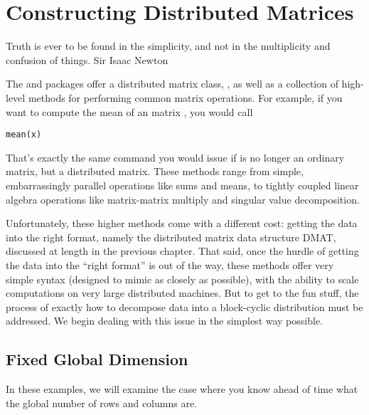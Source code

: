 
\chapter{Constructing Distributed Matrices}
\label{chap:makedmat}

\inspire%
{Truth is ever to be found in the simplicity, and not in the multiplicity and confusion of things. 
}%
{Sir Isaac Newton}
\vspace{0.5cm}


The  and  packages offer a distributed matrix class,
,
as well as a collection of high-level methods for performing common matrix 
operations.  For example, if you want to compute the mean of an  
matrix , you would call 
\begin{lstlisting}[language=rr]
mean(x)
\end{lstlisting}
That's exactly the same command you would issue if  is no longer an 
ordinary  matrix, but a distributed matrix.  These methods range 
from simple, embarrassingly parallel operations like sums and means, to tightly 
coupled linear algebra operations like matrix-matrix multiply and singular value 
decomposition.

Unfortunately, these higher methods come with a different cost:  getting the 
data into the right format, namely the distributed matrix data structure DMAT, 
discussed at length in the previous chapter.  That said, once the hurdle of 
getting the data into the ``right format'' is out of the way, these methods 
offer very simple syntax (designed to mimic  as closely as 
possible), with the ability to scale computations on very large distributed 
machines.  But to get to the fun stuff, the process of exactly how to decompose 
data into a block-cyclic distribution must be addressed.  We begin dealing with 
this issue in the simplest way possible.  




\section{Fixed Global Dimension}

In these examples, we will examine the case where you know ahead of time what 
the global number of rows and columns are.

